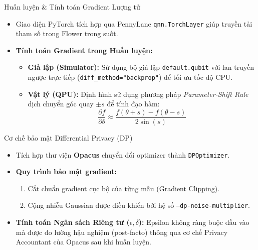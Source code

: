 \documentclass[10pt]{beamer}
\begin{document}
\begin{frame}{Huấn luyện \& Tính toán Gradient Lượng tử}
    \begin{itemize}
        \item Giao diện PyTorch tích hợp qua PennyLane \texttt{qnn.TorchLayer} giúp truyền tải tham số trong Flower trong suốt.
        \item \textbf{Tính toán Gradient trong Huấn luyện:}
        \begin{itemize}
            \item \textbf{Giả lập (Simulator):} Sử dụng bộ giả lập \texttt{default.qubit} với lan truyền ngược trực tiếp (\texttt{diff\_method="backprop"}) để tối ưu tốc độ CPU.
            \item \textbf{Vật lý (QPU):} Định hình sử dụng phương pháp \textit{Parameter-Shift Rule} dịch chuyển góc quay $\pm s$ để tính đạo hàm:
            $$\frac{\partial f}{\partial \theta} \approx \frac{f(\theta + s) - f(\theta - s)}{2 \sin(s)}$$
        \end{itemize}
    \end{itemize}
\end{frame}

\begin{frame}{Cơ chế bảo mật Differential Privacy (DP)}
    \begin{itemize}
        \item Tích hợp thư viện \textbf{Opacus} chuyển đổi optimizer thành \texttt{DPOptimizer}.
        \item \textbf{Quy trình bảo mật gradient:}
        \begin{enumerate}
            \item Cắt chuẩn gradient cục bộ của từng mẫu (Gradient Clipping).
            \item Cộng nhiễu Gaussian được điều khiển bởi hệ số \texttt{--dp-noise-multiplier}.
        \end{enumerate}
        \item \textbf{Tính toán Ngân sách Riêng tư ($\epsilon, \delta$):}
        Epsilon không ràng buộc đầu vào mà được đo lường hậu nghiệm (post-facto) thông qua cơ chế Privacy Accountant của Opacus sau khi huấn luyện.
    \end{itemize}
\end{frame}
\end{document}
